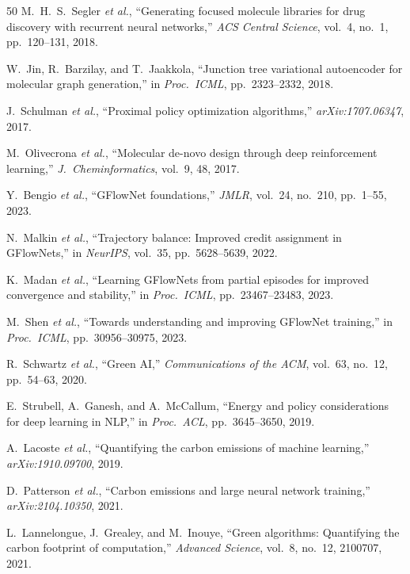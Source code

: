 \documentclass[twocolumn,10pt]{article}
\begin{document}
\begin{thebibliography}{50}
M.~H.~S.~Segler \textit{et al.}, ``Generating focused molecule libraries for drug discovery with recurrent neural networks,'' \textit{ACS Central Science}, vol.~4, no.~1, pp.~120--131, 2018.

W.~Jin, R.~Barzilay, and T.~Jaakkola, ``Junction tree variational autoencoder for molecular graph generation,'' in \textit{Proc.\ ICML}, pp.~2323--2332, 2018.

J.~Schulman \textit{et al.}, ``Proximal policy optimization algorithms,'' \textit{arXiv:1707.06347}, 2017.

M.~Olivecrona \textit{et al.}, ``Molecular de-novo design through deep reinforcement learning,'' \textit{J.\ Cheminformatics}, vol.~9, 48, 2017.

Y.~Bengio \textit{et al.}, ``GFlowNet foundations,'' \textit{JMLR}, vol.~24, no.~210, pp.~1--55, 2023.

N.~Malkin \textit{et al.}, ``Trajectory balance: Improved credit assignment in GFlowNets,'' in \textit{NeurIPS}, vol.~35, pp.~5628--5639, 2022.

K.~Madan \textit{et al.}, ``Learning GFlowNets from partial episodes for improved convergence and stability,'' in \textit{Proc.\ ICML}, pp.~23467--23483, 2023.

M.~Shen \textit{et al.}, ``Towards understanding and improving GFlowNet training,'' in \textit{Proc.\ ICML}, pp.~30956--30975, 2023.

R.~Schwartz \textit{et al.}, ``Green AI,'' \textit{Communications of the ACM}, vol.~63, no.~12, pp.~54--63, 2020.

E.~Strubell, A.~Ganesh, and A.~McCallum, ``Energy and policy considerations for deep learning in NLP,'' in \textit{Proc.\ ACL}, pp.~3645--3650, 2019.

A.~Lacoste \textit{et al.}, ``Quantifying the carbon emissions of machine learning,'' \textit{arXiv:1910.09700}, 2019.

D.~Patterson \textit{et al.}, ``Carbon emissions and large neural network training,'' \textit{arXiv:2104.10350}, 2021.

L.~Lannelongue, J.~Grealey, and M.~Inouye, ``Green algorithms: Quantifying the carbon footprint of computation,'' \textit{Advanced Science}, vol.~8, no.~12, 2100707, 2021.


\end{thebibliography}
\end{document}
